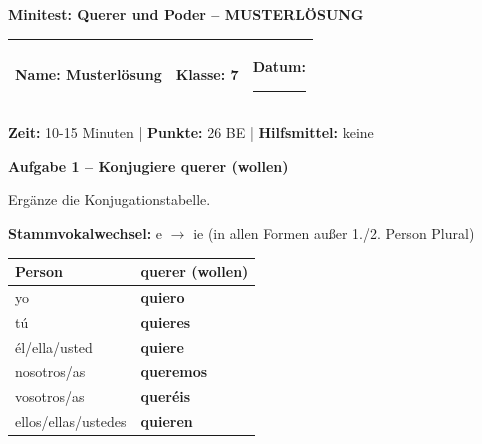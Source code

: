 \documentclass[11pt, a4paper]{article}
\newcommand{\fachfarbe}{spanisch}
\newcommand{\thema}{Minitest: Querer und Poder -- MUSTERLÖSUNG}
\newcommand{\klasse}{7}
\newcommand{\maxpunkte}{26}
\newcommand{\zeit}{10-15 Minuten}
\newcommand{\punktebox}[1]{\hfill\fbox{\small \_/#1}}
\newcommand{\luecke}[1]{\rule{#1}{0.4pt}}
\newcommand{\lsg}[1]{\textcolor{loesung}{\textbf{#1}}}
\newenvironment{aufgabe}[1]{%
    \needspace{5\baselineskip}%
    \nopagebreak[4]%
    \vspace{10pt}
    \noindent\textbf{\textcolor{\fachfarbe}{Aufgabe #1}}
    \nopagebreak[4]%
    \vspace{5pt}
    \nopagebreak[4]%
    \begin{list}{}{\leftmargin=0pt}
    \item[]
}{%
    \end{list}
}
\newcommand{\es}[1]{\textcolor{\fachfarbe}{\textbf{#1}}}
\begin{document}

\begin{center}
    {\Large\bfseries\textcolor{loesung}{\thema}}
\end{center}

\vspace{5pt}

\noindent
\begin{tabularx}{\textwidth}{|X|X|X|}
\hline
\textbf{Name:} \lsg{Musterlösung} &
\textbf{Klasse:} \klasse &
\textbf{Datum:} \luecke{2cm} \\
\hline
\end{tabularx}

\vspace{10pt}

\begin{infobox}
\textbf{Zeit:} \zeit{} | \textbf{Punkte:} \maxpunkte{} BE | \textbf{Hilfsmittel:} keine
\end{infobox}

\vspace{15pt}


\begin{aufgabe}{1 -- Konjugiere \es{querer} (wollen)}
Ergänze die Konjugationstabelle. \punktebox{6}
\end{aufgabe}

\begin{hinweis}
\textbf{Stammvokalwechsel:} e $\rightarrow$ ie (in allen Formen außer 1./2. Person Plural)
\end{hinweis}

\vspace{0.5em}

\noindent
\begin{tabularx}{\textwidth}{|l|X|}
\hline
\textbf{Person} & \textbf{querer (wollen)} \\
\hline
yo & \lsg{quiero} \\[0.5em]
\hline
tú & \lsg{quieres} \\[0.5em]
\hline
él/ella/usted & \lsg{quiere} \\[0.5em]
\hline
nosotros/as & \lsg{queremos} \\[0.5em]
\hline
vosotros/as & \lsg{queréis} \\[0.5em]
\hline
ellos/ellas/ustedes & \lsg{quieren} \\[0.5em]
\hline
\end{tabularx}
\end{document}
